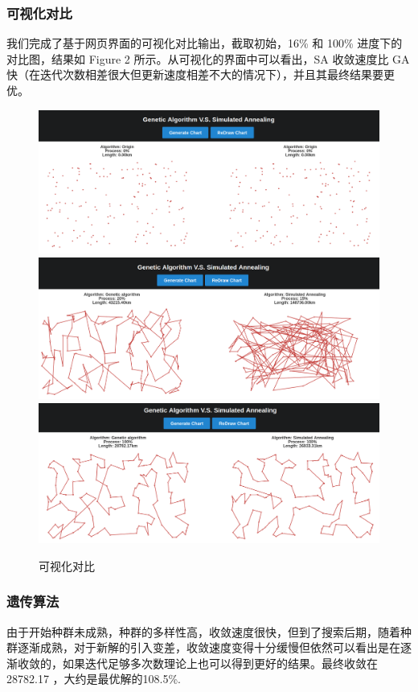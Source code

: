 \subsubsection{可视化对比}
我们完成了基于网页界面的可视化对比输出，截取初始，16\% 和 100\% 进度下的对比图，结果如 Figure 2 所示。从可视化的界面中可以看出，SA 收敛速度比 GA 快（在迭代次数相差很大但更新速度相差不大的情况下），并且其最终结果要更优。

\begin{figure}
\centering
\includegraphics[width=\textwidth]{init.png}
\includegraphics[width=\textwidth]{half.png}
\includegraphics[width=\textwidth]{final.png}
\caption{\label{fig:final}可视化对比}
\end{figure}

\subsubsection{遗传算法}
由于开始种群未成熟，种群的多样性高，收敛速度很快，但到了搜索后期，随着种群逐渐成熟，对于新解的引入变差，收敛速度变得十分缓慢但依然可以看出是在逐渐收敛的，如果迭代足够多次数理论上也可以得到更好的结果。最终收敛在 28782.17 ，大约是最优解的108.5\%.


